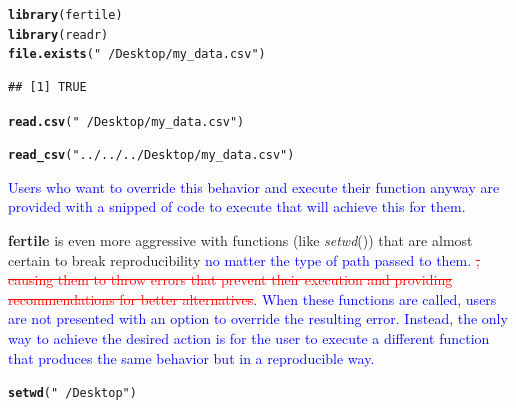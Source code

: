 \documentclass[APA,LATO1COL]{WileyNJD-v2}\usepackage[]{graphicx}\usepackage[]{color}
\makeatletter
\newcommand{\hlstr}[1]{\textcolor[rgb]{0.192,0.494,0.8}{#1}}%
\newcommand{\hlstd}[1]{\textcolor[rgb]{0.345,0.345,0.345}{#1}}%
\newcommand{\hlkwd}[1]{\textcolor[rgb]{0.737,0.353,0.396}{\textbf{#1}}}%
\newenvironment{kframe}{%
 \def\at@end@of@kframe{}%
 \ifinner\ifhmode%
  \def\at@end@of@kframe{\end{minipage}}%
  \begin{minipage}{\columnwidth}%
 \fi\fi%
 \def\FrameCommand##1{\hskip\@totalleftmargin \hskip-\fboxsep
 \colorbox{shadecolor}{##1}\hskip-\fboxsep
     \hskip-\linewidth \hskip-\@totalleftmargin \hskip\columnwidth}%
 \MakeFramed {\advance\hsize-\width
   \@totalleftmargin\z@ \linewidth\hsize
   \@setminipage}}%
 {\par\unskip\endMakeFramed%
 \at@end@of@kframe}
\newenvironment{knitrout}{}{} %
\newcommand{\pkg}[1]{\textbf{#1}}
\newcommand{\func}[1]{\textit{#1}()}
\makeatother
\begin{document}
\begin{knitrout}
\color{fgcolor}\begin{kframe}
\begin{alltt}
\hlkwd{library}\hlstd{(fertile)}
\hlkwd{library}\hlstd{(readr)}
\hlkwd{file.exists}\hlstd{(}\hlstr{"~/Desktop/my_data.csv"}\hlstd{)}
\end{alltt}
\begin{verbatim}
## [1] TRUE
\end{verbatim}
\begin{alltt}
\hlkwd{read.csv}\hlstd{(}\hlstr{"~/Desktop/my_data.csv"}\hlstd{)}
\end{alltt}


{\ttfamily\noindent\bfseries{}}\begin{alltt}
\hlkwd{read_csv}\hlstd{(}\hlstr{"../../../Desktop/my_data.csv"}\hlstd{)}
\end{alltt}


{\ttfamily\noindent\bfseries\color{errorcolor}{\#\# Error: Detected paths that lead outside the project directory. Such paths are not reproducible and will likely only work on your computer. If you would like to continue anyway, please execute the following command: readr::read\_csv('../../../Desktop/my\_data.csv')}}\end{kframe}
\end{knitrout}

\textcolor{blue}{Users who want to override this behavior and execute their function anyway are provided with a snipped of code to execute that will achieve this for them.}

\pkg{fertile} is even more aggressive with functions (like \func{setwd}) that are almost certain to break reproducibility \textcolor{blue}{no matter the type of path passed to them}. \textcolor{red}{\st{, causing them to throw errors that prevent their execution and providing recommendations for better alternatives}}. \textcolor{blue}{When these functions are called, users are not presented with an option to override the resulting error. Instead, the only way to achieve the desired action is for the user to execute a different function that produces the same behavior but in a reproducible way.}

\begin{knitrout}
\color{fgcolor}\begin{kframe}
\begin{alltt}
\hlkwd{setwd}\hlstd{(}\hlstr{"~/Desktop"}\hlstd{)}
\end{alltt}


{\ttfamily\noindent\bfseries\color{errorcolor}{\#\# Error: setwd() is likely to break reproducibility. Use here::here() instead.}}\end{kframe}
\end{knitrout}
\end{document}
